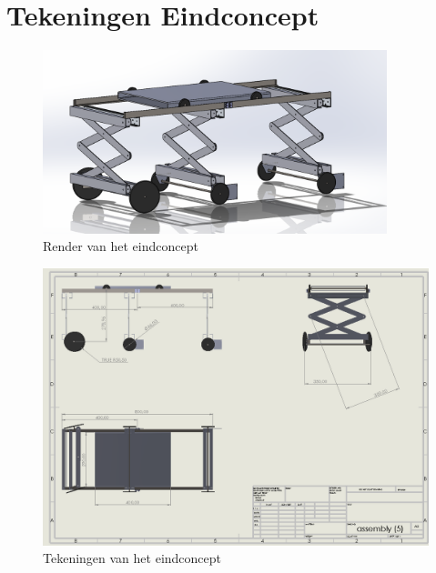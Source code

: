 \chapter{Tekeningen Eindconcept}
\label{cha:bijlage_D}

\begin{figure}[H]
    \centering
    \includegraphics[width = 100mm]{04_gekozenconcept/eindconcept.png}
    \caption{Render van het eindconcept}
    \label{fig:render_eindconcept}
\end{figure}

\begin{figure}[H]
    \centering
    \includegraphics[width = 180mm,angle =270]{04_gekozenconcept/tekeningeindconcept.png}
    \caption{Tekeningen van het eindconcept}
    \label{fig:tekeningen_eindconcept}
\end{figure}